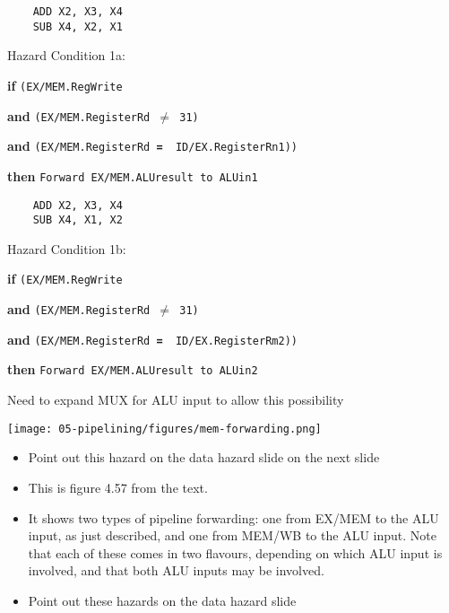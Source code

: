 \begin{frame}[fragile]
  {\footnotesize
\begin{multicols}{2}
\begin{verbatim}
    ADD X2, X3, X4
    SUB X4, X2, X1
\end{verbatim}
Hazard Condition 1a:

\textbf{if} {\tt ({\color{orange}EX/MEM.RegWrite }}

\textbf{and} {\tt ({\color{olive}EX/MEM.RegisterRd $\ne$ 31})}

\textbf{and} {\tt ({\color{red}EX/MEM.RegisterRd} \textbf{=} {\color{blue} ID/EX.RegisterRn1}))}

\textbf{then} {\tt Forward EX/MEM.ALUresult to ALUin1}
\columnbreak

\begin{verbatim}
    ADD X2, X3, X4
    SUB X4, X1, X2
\end{verbatim}

Hazard Condition 1b:

\textbf{if} {\tt ({\color{orange}EX/MEM.RegWrite }}

\textbf{and} {\tt ({\color{olive}EX/MEM.RegisterRd $\ne$ 31})}

\textbf{and} {\tt ({\color{red}EX/MEM.RegisterRd} \textbf{=} {\color{blue} ID/EX.RegisterRm2}))}

\textbf{then} {\tt Forward EX/MEM.ALUresult to ALUin2}
\end{multicols}}

Need to expand MUX for ALU input to allow this possibility

\begin{center}
\texttt{[image: 05-pipelining/figures/mem-forwarding.png]}    
\end{center}

\BNotes\ifnum{}
\begin{itemize}
\item Point out this hazard on the data hazard slide on the next slide
\item This is figure 4.57 from the text. 
\item It shows two types of pipeline
	forwarding: one from EX/MEM to the ALU input, as just described, and
	one from MEM/WB to the ALU input. Note that each of these comes in two
	flavours, depending on which ALU input is involved, and that both ALU
	inputs may be involved.
\item Point out these hazards on the data hazard slide
\end{itemize}
\fi\ENotes
\end{frame}

